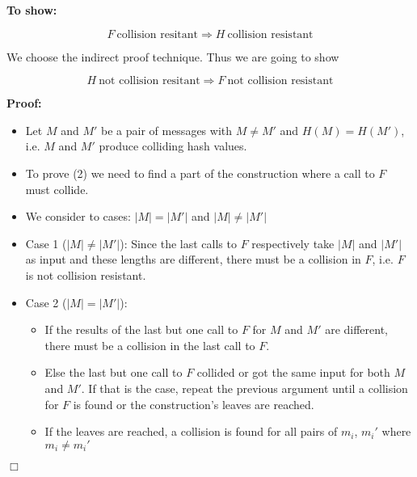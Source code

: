 \textbf{To show:}

\begin{equation}
F\ \text{collision resitant} \Rightarrow H\ \text{collision resistant}
\end{equation}

We choose the indirect proof technique. Thus we are going to show

\begin{equation}
H\ \text{not collision resitant} \Rightarrow F\ \text{not collision resistant}
\end{equation}

\newpage

\textbf{Proof:}

\begin{itemize}
\item Let $M$ and $M'$ be a pair of messages with $M \neq M'$ and $H(M) = H(M')$, i.e. $M$ and $M'$ produce colliding hash values.
\item To prove (2) we need to find a part of the construction where a call to $F$ must collide.
\item We consider to cases: $|M| = |M'|$ and $|M| \neq |M'|$
\item Case 1 ($|M| \neq |M'|$): Since the last calls to $F$ respectively take $|M|$ and $|M'|$ as input and these lengths are different, there must be a collision in $F$, i.e. $F$ is not collision resistant.
\item Case 2 ($|M| = |M'|$):

\begin{itemize}
\item If the results of the last but one call to $F$ for $M$ and $M'$ are different, there must be a collision in the last call to $F$.
\item Else the last but one call to $F$ collided or got the same input for both $M$ and $M'$. If that is the case, repeat the previous argument until a collision for $F$ is found or the construction's leaves are reached.
\item If the leaves are reached, a collision is found for all pairs of $m_i$, $m_i'$ where $m_i \neq m_i'$
\end{itemize}

\end{itemize}
\hfill$\Box$


